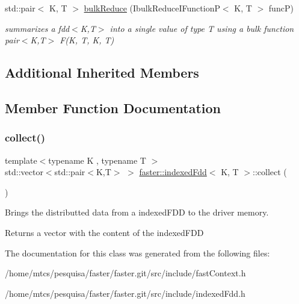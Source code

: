 \begin{DoxyCompactItemize}
std\+::pair$<$ K, T $>$ \hyperlink{group__bulk_gac3086716ca3ee4490d76cfb23bce1f62}{bulk\+Reduce} (Ibulk\+Reduce\+I\+FunctionP$<$ K, T $>$ funcP)
\begin{DoxyCompactList}\small\item\em summarizes a fdd$<$\+K,\+T$>$ into a single value of type T using a bulk function {\itshape pair$<$\+K,\+T$>$ F(\+K, T, K, T)} \end{DoxyCompactList}\end{DoxyCompactItemize}
\subsection*{Additional Inherited Members}


\subsection{Member Function Documentation}
\hypertarget{classfaster_1_1indexedFdd_ae8222d15d17bb139bf07435227010607}{}\label{classfaster_1_1indexedFdd_ae8222d15d17bb139bf07435227010607} 
\subsubsection{\texorpdfstring{collect()}{collect()}}
{\footnotesize\ttfamily template$<$typename K , typename T $>$ \\
std\+::vector$<$std\+::pair$<$K,T$>$ $>$ \hyperlink{classfaster_1_1indexedFdd}{faster\+::indexed\+Fdd}$<$ K, T $>$\+::collect (\begin{DoxyParamCaption}{ }\end{DoxyParamCaption})\hspace{0.3cm}{\ttfamily [inline]}}



Brings the distributted data from a indexed\+F\+DD to the driver memory. 

\begin{DoxyReturn}{Returns}
a vector with the content of the indexed\+F\+DD 
\end{DoxyReturn}


The documentation for this class was generated from the following files\+:\begin{DoxyCompactItemize}
\item 
/home/mtcs/pesquisa/faster/faster.\+git/src/include/fast\+Context.\+h\item 
/home/mtcs/pesquisa/faster/faster.\+git/src/include/indexed\+Fdd.\+h\end{DoxyCompactItemize}
